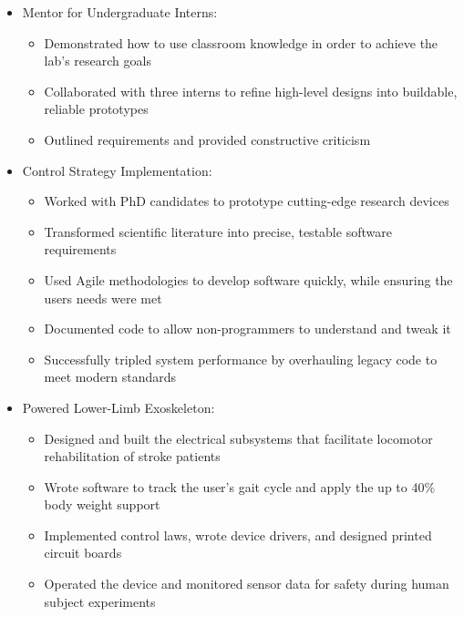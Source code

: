 \documentclass[11pt]{article}
\begin{document}
\begin{itemize}
    \item Mentor for Undergraduate Interns:
    \begin{itemize}
        \item Demonstrated how to use classroom knowledge in order to achieve the lab's research goals
        \item Collaborated with three interns to refine high-level designs into buildable, reliable prototypes
        \item Outlined requirements and provided constructive criticism
    \end{itemize}
    \item Control Strategy Implementation:
    \begin{itemize}
        \item Worked with PhD candidates to prototype cutting-edge research devices
        \item Transformed scientific literature into precise, testable software requirements
        \item Used Agile methodologies to develop software quickly, while ensuring the user\textsc{}s needs were met
        \item Documented code to allow non-programmers to understand and tweak it
        \item Successfully tripled system performance by overhauling legacy code to meet modern standards
    \end{itemize}
    \item Powered Lower-Limb Exoskeleton:
    \begin{itemize}
        \item Designed and built the electrical subsystems that facilitate locomotor rehabilitation of stroke patients %
        \item Wrote software to track the user’s gait cycle and apply the up to 40\% body weight support
        \item Implemented control laws, wrote device drivers, and designed printed circuit boards
        \item Operated the device and monitored sensor data for safety during human subject experiments
    \end{itemize}
\end{itemize}
\vspace{0.5em}

\vspace{0.5em}
\end{document}
